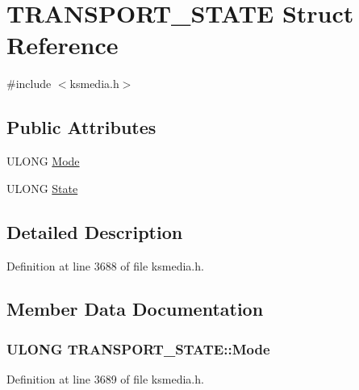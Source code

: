 \hypertarget{struct_t_r_a_n_s_p_o_r_t___s_t_a_t_e}{}\section{T\+R\+A\+N\+S\+P\+O\+R\+T\+\_\+\+S\+T\+A\+TE Struct Reference}
\label{struct_t_r_a_n_s_p_o_r_t___s_t_a_t_e}


{\ttfamily \#include $<$ksmedia.\+h$>$}

\subsection*{Public Attributes}
\begin{DoxyCompactItemize}
\item 
U\+L\+O\+NG \hyperlink{struct_t_r_a_n_s_p_o_r_t___s_t_a_t_e_a9c21566ada7edbbb3b7f6e2ebf2cb0a1}{Mode}
\item 
U\+L\+O\+NG \hyperlink{struct_t_r_a_n_s_p_o_r_t___s_t_a_t_e_a0b2ae5ba62a876dc3ba3457d2e3ac273}{State}
\end{DoxyCompactItemize}


\subsection{Detailed Description}


Definition at line 3688 of file ksmedia.\+h.



\subsection{Member Data Documentation}
\subsubsection[{\texorpdfstring{Mode}{Mode}}]{\setlength{\rightskip}{0pt plus 5cm}U\+L\+O\+NG T\+R\+A\+N\+S\+P\+O\+R\+T\+\_\+\+S\+T\+A\+T\+E\+::\+Mode}\hypertarget{struct_t_r_a_n_s_p_o_r_t___s_t_a_t_e_a9c21566ada7edbbb3b7f6e2ebf2cb0a1}{}\label{struct_t_r_a_n_s_p_o_r_t___s_t_a_t_e_a9c21566ada7edbbb3b7f6e2ebf2cb0a1}


Definition at line 3689 of file ksmedia.\+h.

